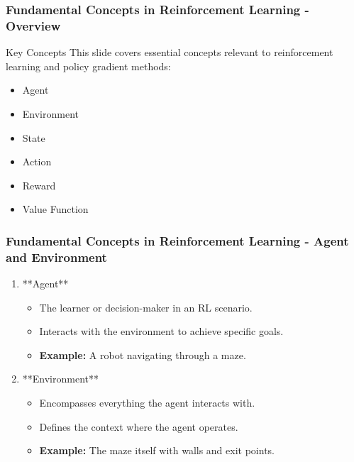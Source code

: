 \documentclass{beamer}
\begin{document}
\begin{frame}[fragile]
    \frametitle{Fundamental Concepts in Reinforcement Learning - Overview}
    \begin{block}{Key Concepts}
        This slide covers essential concepts relevant to reinforcement learning and policy gradient methods:
    \end{block}
    \begin{itemize}
        \item Agent
        \item Environment
        \item State
        \item Action
        \item Reward
        \item Value Function
    \end{itemize}
\end{frame}

\begin{frame}[fragile]
    \frametitle{Fundamental Concepts in Reinforcement Learning - Agent and Environment}
    \begin{enumerate}
        \item **Agent**
            \begin{itemize}
                \item The learner or decision-maker in an RL scenario.
                \item Interacts with the environment to achieve specific goals.
                \item \textbf{Example:} A robot navigating through a maze.
            \end{itemize}
        
        \item **Environment**
            \begin{itemize}
                \item Encompasses everything the agent interacts with.
                \item Defines the context where the agent operates.
                \item \textbf{Example:} The maze itself with walls and exit points.
            \end{itemize}
    \end{enumerate}
\end{frame}
\end{document}
